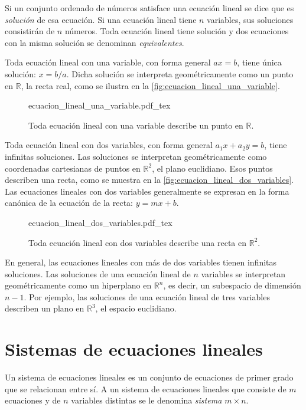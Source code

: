 \documentclass{fmbnotes}
\begin{document}
Si un conjunto ordenado de números satisface una ecuación lineal se dice que es \emph{solución} de esa ecuación. Si una ecuación lineal tiene \(n\) variables, sus soluciones consistirán de \(n\) números. Toda ecuación lineal tiene solución y dos ecuaciones con la misma solución se denominan \emph{equivalentes}. 

Toda ecuación lineal con una variable, con forma general \(ax=b\), tiene única solución: \(x=b/a\). Dicha solución se interpreta geométricamente como un punto en \(\mathbb{R}\), la recta real, como se ilustra en la \autoref{fig:ecuacion_lineal_una_variable}.

\begin{figure}[h]
\centering
{ecuacion_lineal_una_variable.pdf_tex}
\caption{Toda ecuación lineal con una variable describe un punto en \(\mathbb{R}\).}
\label{fig:ecuacion_lineal_una_variable}
\end{figure}

Toda ecuación lineal con dos variables, con forma general \(a_1x+a_2y=b\), tiene infinitas soluciones. Las soluciones se interpretan geométricamente como coordenadas cartesianas de puntos en \(\mathbb{R}^{2}\), el plano euclidiano. Esos puntos describen una recta, como se muestra en la \autoref{fig:ecuacion_lineal_dos_variables}. Las ecuaciones lineales con dos variables generalmente se expresan en la forma canónica de la ecuación de la recta: \(y=mx+b\).

\begin{figure}[h]
\centering
{ecuacion_lineal_dos_variables.pdf_tex}
\caption{Toda ecuación lineal con dos variables describe una recta en \(\mathbb{R}^{2}\).}
\label{fig:ecuacion_lineal_dos_variables}
\end{figure}

En general, las ecuaciones lineales con más de dos variables tienen infinitas soluciones. Las soluciones de una ecuación lineal de \(n\) variables se interpretan geométricamente como un hiperplano en \(\mathbb{R}^{n}\), es decir, un subespacio de dimensión \(n-1\). Por ejemplo, las soluciones de una ecuación lineal de tres variables describen un plano en \(\mathbb{R}^{3}\), el espacio euclidiano.

\section{Sistemas de ecuaciones lineales}

Un sistema de ecuaciones lineales es un conjunto de ecuaciones de primer grado que se relacionan entre sí. A un sistema de ecuaciones lineales que consiste de \( m \) ecuaciones y de \( n \) variables distintas se le denomina \emph{sistema \(m \times n\)}.
\end{document}
